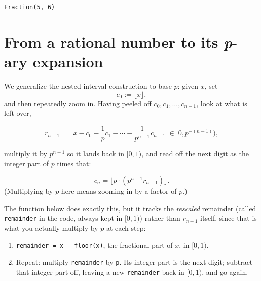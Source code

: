 \documentclass[
  letterpaper,
  DIV=11,
  numbers=noendperiod]{scrreprt}
\providecommand{\tightlist}{%
  \setlength{\itemsep}{0pt}\setlength{\parskip}{0pt}}
\theoremstyle{plain}
\theoremstyle{plain}
\theoremstyle{definition}
\theoremstyle{definition}
\theoremstyle{definition}
\theoremstyle{plain}
\theoremstyle{plain}
\theoremstyle{remark}
\begin{document}
\begin{verbatim}
Fraction(5, 6)
\end{verbatim}

\section{\texorpdfstring{From a rational number to its \emph{p}-ary
expansion}{From a rational number to its p-ary expansion}}\label{from-a-rational-number-to-its-p-ary-expansion}

We generalize the nested interval construction to base \(p\): given
\(x\), set \[
c_0 := \lfloor x \rfloor,
\] and then repeatedly zoom in. Having peeled off
\(c_0,c_1,\dots,c_{n-1}\), look at what is left over,

\[
r_{n-1} \;=\; x - c_0 - \frac{1}{p}c_1 - \cdots - \frac{1}{p^{n-1}}c_{n-1} \;\in [0, p^{-(n-1)}),
\]

multiply it by \(p^{n-1}\) so it lands back in \([0,1)\), and read off
the next digit as the integer part of \(p\) times that:

\[
c_n = \lfloor p \cdot (p^{n-1} r_{n-1}) \rfloor.
\] (Multiplying by \(p\) here means zooming in by a factor of \(p\).)

The function below does exactly this, but it tracks the \emph{rescaled}
remainder (called \texttt{remainder} in the code, always kept in
\([0,1)\)) rather than \(r_{n-1}\) itself, since that is what you
actually multiply by \(p\) at each step:

\begin{enumerate}
\def\labelenumi{\arabic{enumi}.}
\tightlist
\item
  \texttt{remainder\ =\ x\ -\ floor(x)}, the fractional part of \(x\),
  in \([0,1)\).
\item
  Repeat: multiply \texttt{remainder} by \texttt{p}. Its integer part is
  the next digit; subtract that integer part off, leaving a new
  \texttt{remainder} back in \([0,1)\), and go again.
\end{enumerate}
\end{document}
